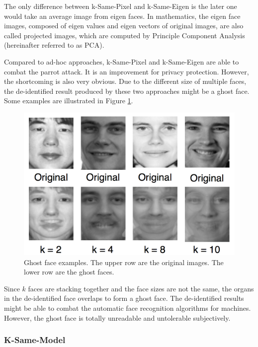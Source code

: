 	The only difference between k-Same-Pixel and k-Same-Eigen is the later one 
	would take an average image from eigen faces. In mathematics, the eigen face 
	images, composed of eigen values and eigen vectors of original images, are 
	also called projected images, which are computed by Principle Component 
	Analysis (hereinafter referred to as PCA). 

	Compared to ad-hoc approaches, k-Same-Pixel and k-Same-Eigen are able to combat 
	the parrot attack. It is an improvement for privacy protection. However, the
	shortcoming is also very obvious. Due to the different size of multiple faces,
	the de-identified result produced by these two approaches might be a ghost face. 
	Some examples are illustrated in Figure \ref{fig:ghostFace}.
	
	\begin{figure}[!htb]
	    \centering
	    \includegraphics[scale=0.67]{figure/ghostFace}
	    \caption{Ghost face examples. The upper row are the original images. The lower
	    	row are the ghost faces.}
	    \label{fig:ghostFace}
  	\end{figure}

  	Since $k$ faces are stacking together and the face sizes are not the same,
  	the organs in the de-identified face overlaps to form a ghost face. 
  	The de-identified results might be able to combat the automatic face 
  	recognition algorithms for machines. However,
  	the ghost face is totally unreadable and untolerable subjectively. 

	\subsubsection{K-Same-Model}

